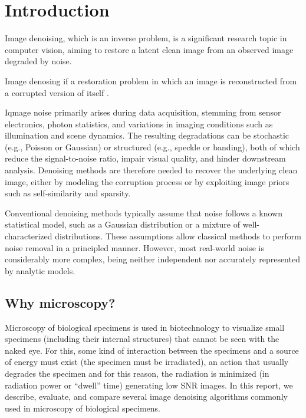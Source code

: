 \chapter{Introduction}

Image denoising, which is an inverse problem, is a significant
research topic in computer vision, aiming to restore a latent clean
image from an observed image degraded by
noise. %


Image denosing if a restoration problem in which an image is
reconstructed from a corrupted version of itself
\cite{BUCHHOLZ2019277}.

Iqmage noise primarily arises during data acquisition, stemming from
sensor electronics, photon statistics, and variations in imaging
conditions such as illumination and scene dynamics. The resulting
degradations can be stochastic (e.g., Poisson or Gaussian) or
structured (e.g., speckle or banding), both of which reduce the
signal-to-noise ratio, impair visual quality, and hinder downstream
analysis. Denoising methods are therefore needed to recover the
underlying clean image, either by modeling the corruption process or
by exploiting image priors such as self-similarity and
sparsity. %

Conventional denoising methods typically assume that noise follows a
known statistical model, such as a Gaussian distribution or a mixture
of well-characterized distributions. These assumptions allow
classical methods to perform noise removal in a principled
manner. However, most real-world noise is considerably more complex,
being neither independent nor accurately represented by analytic
models.  %

\section{Why microscopy?}
Microscopy of biological specimens is used in biotechnology to
visualize small specimens (including their internal structures) that
cannot be seen with the naked eye. For this, some kind of interaction
between the specimens and a source of energy must exist (the specimen
must be irradiated), an action that usually degrades the specimen and
for this reason, the radiation is minimized (in radiation power or
``dwell'' time) generating low SNR images. In this report, we describe,
evaluate, and compare several image denoising algorithms commonly used
in microscopy of biological specimens.

